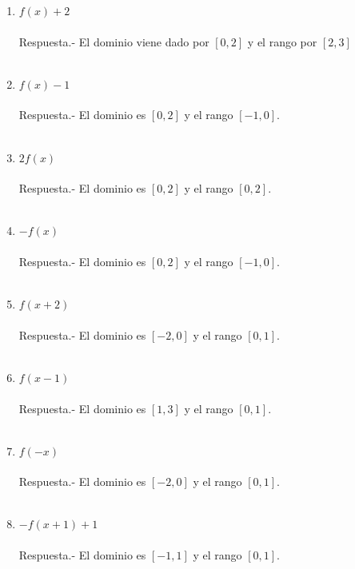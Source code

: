 \begin{enumerate}
\begin{enumerate}[\bfseries a)]
	\item $f(x)+2$\\\\
	    Respuesta.-\; El dominio viene dado por $[0,2]$ y el rango por $[2,3]$\\\\

	\item $f(x)-1$\\\\
	    Respuesta.-\; El dominio es $[0,2]$ y el rango $[-1,0]$.\\\\ 

	\item $2f(x)$\\\\
	    Respuesta.-\; El dominio es $[0,2]$ y el rango $[0,2]$.\\\\ 

	\item $-f(x)$\\\\
	    Respuesta.-\; El dominio es $[0,2]$ y el rango $[-1,0]$.\\\\ 

	\item $f(x+2)$\\\\
	    Respuesta.-\; El dominio es $[-2,0]$ y el rango $[0,1]$.\\\\ 

	\item $f(x-1)$\\\\
	    Respuesta.-\; El dominio es $[1,3]$ y el rango $[0,1]$.\\\\ 

	\item $f(-x)$\\\\
	    Respuesta.-\; El dominio es $[-2,0]$ y el rango $[0,1]$.\\\\ 

	\item $-f(x+1)+1$\\\\
	    Respuesta.-\; El dominio es $[-1,1]$ y el rango $[0,1]$.\\\\ 


\end{enumerate}
\end{enumerate}
